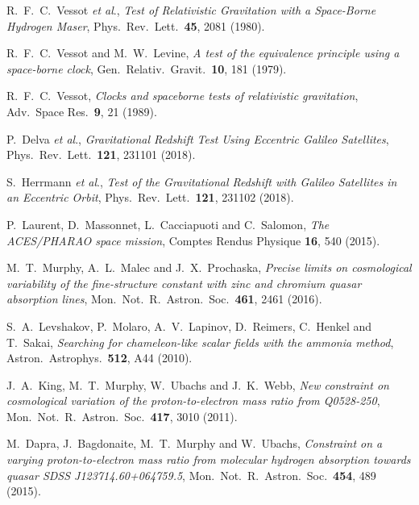 \documentclass[aps,prd,onecolumn,nofootinbib]{revtex4-2} %
\begin{document}
\begin{thebibliography}{99}
 R.~F.~C.~Vessot \textit{et al}., \textit{Test of Relativistic Gravitation with a Space-Borne Hydrogen Maser}, Phys.~Rev.~Lett.~\textbf{45}, 2081 (1980). 

 R.~F.~C.~Vessot and M.~W.~Levine, \textit{A test of the equivalence principle using a space-borne clock}, Gen.~Relativ.~Gravit.~\textbf{10}, 181 (1979). 

 R.~F.~C.~Vessot, \textit{Clocks and spaceborne tests of relativistic gravitation}, Adv.~Space Res.~\textbf{9}, 21 (1989). 


 P.~Delva \textit{et al}., \textit{Gravitational Redshift Test Using Eccentric Galileo Satellites}, Phys.~Rev.~Lett.~\textbf{121}, 231101 (2018). 

 S.~Herrmann \textit{et al}., \textit{Test of the Gravitational Redshift with Galileo Satellites in an Eccentric Orbit}, Phys.~Rev.~Lett.~\textbf{121}, 231102 (2018). 

 P.~Laurent, D.~Massonnet, L.~Cacciapuoti and C.~Salomon, \textit{The ACES/PHARAO space mission}, Comptes Rendus Physique \textbf{16}, 540 (2015). 


 M.~T.~Murphy, A.~L.~Malec and J.~X.~Prochaska, \textit{Precise limits on cosmological variability of the fine-structure constant with zinc and chromium quasar absorption lines}, Mon.~Not.~R.~Astron.~Soc.~\textbf{461}, 2461 (2016). 

 S.~A.~Levshakov, P.~Molaro, A.~V.~Lapinov, D.~Reimers, C.~Henkel and T.~Sakai, \textit{Searching for chameleon-like scalar fields with the ammonia method}, Astron.~Astrophys.~\textbf{512}, A44 (2010). 

 J.~A.~King, M.~T.~Murphy, W.~Ubachs and J.~K.~Webb, \textit{New constraint on cosmological variation of the proton-to-electron mass ratio from Q0528-250}, Mon.~Not.~R.~Astron.~Soc.~\textbf{417}, 3010 (2011). 

 M.~Dapra, J.~Bagdonaite, M.~T.~Murphy and W.~Ubachs, \textit{Constraint on a varying proton-to-electron mass ratio from molecular hydrogen absorption towards quasar SDSS J123714.60+064759.5}, Mon.~Not.~R.~Astron.~Soc.~\textbf{454}, 489 (2015). 



\end{thebibliography}
\end{document}

